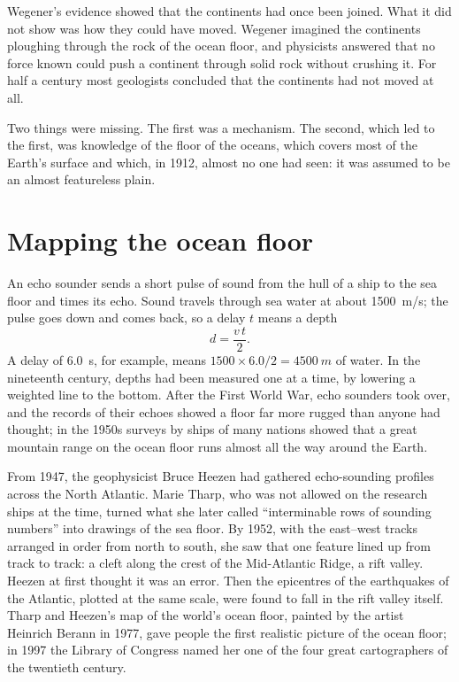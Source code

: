 Wegener's evidence showed that the continents had once been joined. What it
did not show was how they could have moved. Wegener imagined the continents
ploughing through the rock of the ocean floor, and physicists answered that no force known could push a continent through solid
rock without crushing it. For half a century most geologists concluded that
the continents had not moved at all.

Two things were missing. The first was a mechanism. The second, which led to
the first, was knowledge of the floor of the oceans, which covers most of the
Earth's surface and which, in 1912, almost no one had seen: it was assumed to
be an almost featureless plain.

\section{Mapping the ocean floor}

An echo sounder sends a short pulse of sound from the hull of a ship to the
sea floor and times its echo. Sound travels through sea water at about
\qty{1500}{m/s}; the pulse goes down and comes back, so a delay $t$ means a
depth
\[
  d = \frac{v\,t}{2}.
\]
A delay of \qty{6.0}{s}, for example, means $1500 \times 6.0/2 =
\qty{4500}{m}$ of water. In the nineteenth century, depths had been measured one
at a time, by lowering a weighted line to the bottom. After the First World
War, echo sounders took over, and the records of their echoes showed a floor
far more rugged than anyone had thought; in the 1950s surveys by ships of many nations showed that a
great mountain range on the ocean floor runs almost all the way around the
Earth.

\begin{history}
From 1947, the geophysicist Bruce Heezen had gathered echo-sounding profiles
across the North Atlantic. Marie Tharp, who was not allowed on the research
ships at the time, turned what she later called ``interminable rows of
sounding numbers'' into drawings of the sea floor. By 1952, with the east--west
tracks arranged in order from north to south, she saw that one feature lined up
from track to track: a cleft along the crest of the Mid-Atlantic Ridge, a rift
valley. Heezen at first thought it was an error. Then the epicentres of the
earthquakes of the Atlantic, plotted at the same scale, were found to fall in
the rift valley itself. Tharp and Heezen's map of the world's ocean floor,
painted by the artist Heinrich Berann in 1977, gave people the first realistic picture of the ocean floor; in 1997 the
Library of Congress named her one of the four great cartographers of the
twentieth century.
\end{history}

